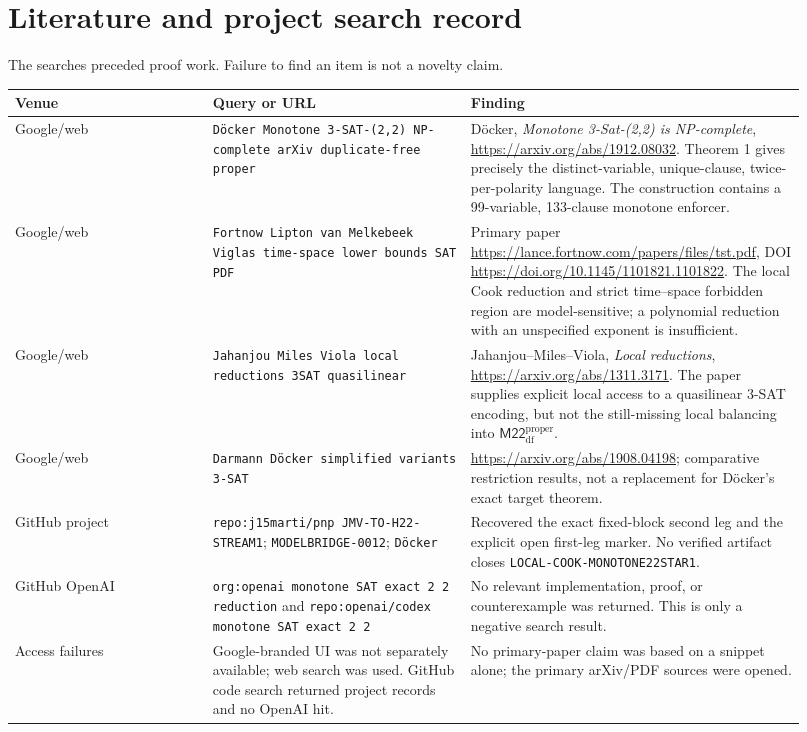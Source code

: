 \documentclass[11pt]{article}
\newcommand{\M}{\mathsf{M22}^{\mathrm{proper}}_{\mathrm{df}}}
\begin{document}
\section{Literature and project search record}

The searches preceded proof work.  Failure to find an item is not a novelty claim.

\begin{longtable}{p{0.23\linewidth}p{0.30\linewidth}p{0.39\linewidth}}
\toprule
Venue & Query or URL & Finding \\
\midrule
\endhead
Google/web & \texttt{D\"ocker Monotone 3-SAT-(2,2) NP-complete arXiv duplicate-free proper} &
D\"ocker, \emph{Monotone 3-Sat-(2,2) is NP-complete},
\url{https://arxiv.org/abs/1912.08032}.  Theorem 1 gives precisely the distinct-variable,
unique-clause, twice-per-polarity language.  The construction contains a 99-variable,
133-clause monotone enforcer. \\
Google/web & \texttt{Fortnow Lipton van Melkebeek Viglas time-space lower bounds SAT PDF} &
Primary paper \url{https://lance.fortnow.com/papers/files/tst.pdf}, DOI
\url{https://doi.org/10.1145/1101821.1101822}.  The local Cook reduction and strict
time--space forbidden region are model-sensitive; a polynomial reduction with an
unspecified exponent is insufficient. \\
Google/web & \texttt{Jahanjou Miles Viola local reductions 3SAT quasilinear} &
Jahanjou--Miles--Viola, \emph{Local reductions},
\url{https://arxiv.org/abs/1311.3171}.  The paper supplies explicit local access to a
quasilinear 3-SAT encoding, but not the still-missing local balancing into $\M$. \\
Google/web & \texttt{Darmann D\"ocker simplified variants 3-SAT} &
\url{https://arxiv.org/abs/1908.04198}; comparative restriction results, not a
replacement for D\"ocker's exact target theorem. \\
GitHub project & \texttt{repo:j15marti/pnp JMV-TO-H22-STREAM1};
\texttt{MODELBRIDGE-0012}; \texttt{D\"ocker} &
Recovered the exact fixed-block second leg and the explicit open first-leg marker.
No verified artifact closes \texttt{LOCAL-COOK-MONOTONE22STAR1}. \\
GitHub OpenAI & \texttt{org:openai monotone SAT exact 2 2 reduction} and
\texttt{repo:openai/codex monotone SAT exact 2 2} & No relevant implementation,
proof, or counterexample was returned.  This is only a negative search result. \\
Access failures & Google-branded UI was not separately available; web search was used.
GitHub code search returned project records and no OpenAI hit. & No primary-paper
claim was based on a snippet alone; the primary arXiv/PDF sources were opened. \\
\bottomrule
\end{longtable}
\end{document}
